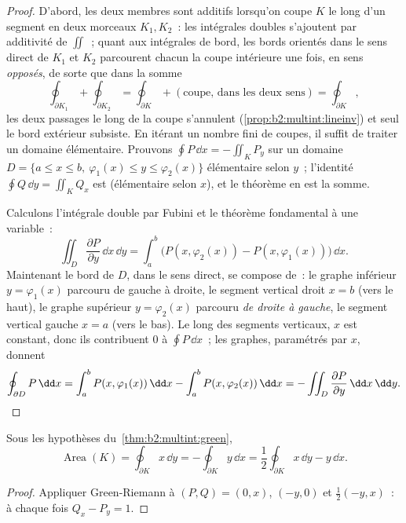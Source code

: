 \begin{proof}
D'abord, les deux membres sont additifs lorsqu'on coupe $K$ le long
d'un segment en deux morceaux $K_1, K_2$~: les intégrales doubles
s'ajoutent par additivité de $\iint$~; quant aux intégrales de bord,
les bords orientés dans le sens direct de $K_1$ et $K_2$ parcourent
chacun la coupe intérieure une fois, en sens \emph{opposés}, de sorte
que dans la somme
\[
\oint_{\partial K_1} + \oint_{\partial K_2}
= \oint_{\partial K} + (\text{coupe, dans les deux sens})
= \oint_{\partial K},
\]
les deux passages le long de la coupe s'annulent
(\cref{prop:b2:multint:lineinv}) et seul le bord extérieur subsiste.
En itérant un nombre fini de coupes, il suffit de traiter un domaine
élémentaire. Prouvons $\oint P\,\dd x = -\iint_K P_y$ sur un domaine
$D = \{a \leq x \leq b,\ \varphi_1(x) \leq y \leq \varphi_2(x)\}$
élémentaire selon $y$~; l'identité $\oint Q\,\dd y = \iint_K Q_x$
est  (élémentaire selon $x$), et le théorème en est la somme.

Calculons l'intégrale double par Fubini et le théorème fondamental à
une variable~:
\[
\iint_D \frac{\partial P}{\partial y}\,\dd x\,\dd y
= \int_a^b \bigl(P(x, \varphi_2(x)) - P(x, \varphi_1(x))\bigr)
\,\dd x .
\]
Maintenant le bord de $D$, dans le sens direct, se compose de~: le
graphe inférieur $y = \varphi_1(x)$ parcouru de gauche à droite, le
segment vertical droit $x = b$ (vers le haut), le graphe supérieur
$y = \varphi_2(x)$ parcouru \emph{de droite à gauche}, le segment
vertical gauche $x = a$ (vers le bas). Le long des segments verticaux,
$x$ est constant, donc ils contribuent $0$ à $\oint P\,\dd x$~; les
graphes, paramétrés par $x$, donnent
\[
\oint_{\partial D} P\,\dd x
= \int_a^b P(x, \varphi_1(x))\,\dd x
- \int_a^b P(x, \varphi_2(x))\,\dd x
= -\iint_D \frac{\partial P}{\partial y}\,\dd x\,\dd y .
\qedhere
\]
\end{proof}

\begin{corollary}\label{cor:b2:multint:area}
Sous les hypothèses du~\cref{thm:b2:multint:green},
\[
\operatorname{Area}(K)
= \oint_{\partial K} x\,\dd y
= -\oint_{\partial K} y\,\dd x
= \frac12\oint_{\partial K} x\,\dd y - y\,\dd x .
\]
\end{corollary}

\begin{proof}
Appliquer Green-Riemann à $(P, Q) = (0, x)$, $(-y, 0)$ et
$\frac12(-y, x)$~: à chaque fois $Q_x - P_y = 1$.
\end{proof}

